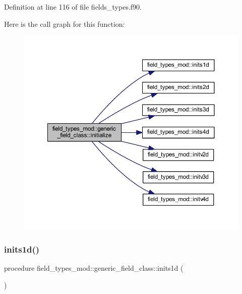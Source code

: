 Definition at line 116 of file fields\+\_\+types.\+f90.

Here is the call graph for this function\+:\nopagebreak
\begin{figure}[H]
\begin{center}
\leavevmode
\includegraphics[width=350pt]{structfield__types__mod_1_1generic__field__class_ae53b0ee80d41ad66189ad515edc23a3c_cgraph}
\end{center}
\end{figure}
\mbox{\label{structfield__types__mod_1_1generic__field__class_a967be57b1342ca6ebd74b9b5227f893a}} 
\subsubsection{\texorpdfstring{inits1d()}{inits1d()}}
{\footnotesize\ttfamily procedure field\+\_\+types\+\_\+mod\+::generic\+\_\+field\+\_\+class\+::inits1d (\begin{DoxyParamCaption}{ }\end{DoxyParamCaption})\hspace{0.3cm}{\ttfamily [private]}}



